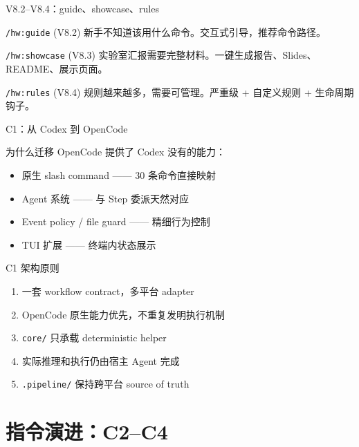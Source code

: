 \documentclass[theme=workflow,aspectratio=169,fontset=tech]{Hypo-Slide}
\begin{document}
\begin{frame}{V8.2--V8.4：guide、showcase、rules}
  \begin{block}{\texttt{/hw:guide} (V8.2)}
    新手不知道该用什么命令。交互式引导，推荐命令路径。
  \end{block}
  \begin{block}{\texttt{/hw:showcase} (V8.3)}
    实验室汇报需要完整材料。一键生成报告、Slides、README、展示页面。
  \end{block}
  \begin{block}{\texttt{/hw:rules} (V8.4)}
    规则越来越多，需要可管理。严重级 + 自定义规则 + 生命周期钩子。
  \end{block}
\end{frame}

\begin{frame}{C1：从 Codex 到 OpenCode}
  \begin{block}{为什么迁移}
    OpenCode 提供了 Codex 没有的能力：
    \begin{itemize}
      \item 原生 slash command —— 30 条命令直接映射
      \item Agent 系统 —— 与 Step 委派天然对应
      \item Event policy / file guard —— 精细行为控制
      \item TUI 扩展 —— 终端内状态展示
    \end{itemize}
  \end{block}
\end{frame}

\begin{frame}{C1 架构原则}
  \begin{enumerate}
    \item 一套 workflow contract，多平台 adapter
    \item OpenCode 原生能力优先，不重复发明执行机制
    \item \texttt{core/} 只承载 deterministic helper
    \item 实际推理和执行仍由宿主 Agent 完成
    \item \texttt{.pipeline/} 保持跨平台 source of truth
  \end{enumerate}
\end{frame}

\section{指令演进：C2--C4}
\end{document}
